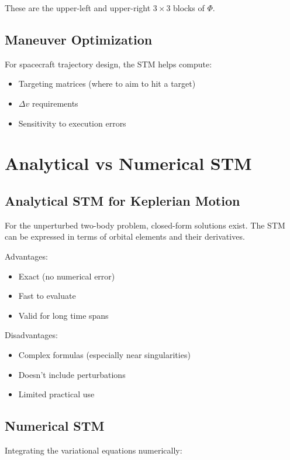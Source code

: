 These are the upper-left and upper-right $3 \times 3$ blocks of $\Phi$.

\subsection{Maneuver Optimization}

For spacecraft trajectory design, the STM helps compute:
\begin{itemize}
    \item Targeting matrices (where to aim to hit a target)
    \item $\Delta v$ requirements
    \item Sensitivity to execution errors
\end{itemize}

\section{Analytical vs Numerical STM}

\subsection{Analytical STM for Keplerian Motion}

For the unperturbed two-body problem, closed-form solutions exist. The STM can be expressed in terms of orbital elements and their derivatives.

Advantages:
\begin{itemize}
    \item Exact (no numerical error)
    \item Fast to evaluate
    \item Valid for long time spans
\end{itemize}

Disadvantages:
\begin{itemize}
    \item Complex formulas (especially near singularities)
    \item Doesn't include perturbations
    \item Limited practical use
\end{itemize}

\subsection{Numerical STM}

Integrating the variational equations numerically:

